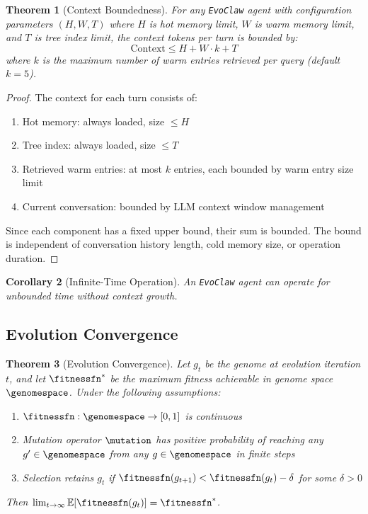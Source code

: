 \documentclass{article}
\newcommand{\evoclaw}{\texttt{EvoClaw}\xspace}
\newtheorem{theorem}{Theorem}[section]
\newtheorem{corollary}[theorem]{Corollary}
\begin{document}
\begin{theorem}[Context Boundedness]
For any \evoclaw{} agent with configuration parameters $(H, W, T)$ where $H$ is hot memory limit, $W$ is warm memory limit, and $T$ is tree index limit, the context tokens per turn is bounded by:
\begin{equation}
\text{Context} \leq H + W \cdot k + T
\end{equation}
where $k$ is the maximum number of warm entries retrieved per query (default $k=5$).
\end{theorem}

\begin{proof}
The context for each turn consists of:
\begin{enumerate}
    \item Hot memory: always loaded, size $\leq H$
    \item Tree index: always loaded, size $\leq T$
    \item Retrieved warm entries: at most $k$ entries, each bounded by warm entry size limit
    \item Current conversation: bounded by LLM context window management
\end{enumerate}
Since each component has a fixed upper bound, their sum is bounded. The bound is independent of conversation history length, cold memory size, or operation duration.
\end{proof}

\begin{corollary}[Infinite-Time Operation]
An \evoclaw{} agent can operate for unbounded time without context growth.
\end{corollary}

\subsection{Evolution Convergence}

\begin{theorem}[Evolution Convergence]
Let $g_t$ be the genome at evolution iteration $t$, and let $\fitnessfn^*$ be the maximum fitness achievable in genome space $\genomespace$. Under the following assumptions:
\begin{enumerate}
    \item $\fitnessfn: \genomespace \to [0, 1]$ is continuous
    \item Mutation operator $\mutation$ has positive probability of reaching any $g' \in \genomespace$ from any $g \in \genomespace$ in finite steps
    \item Selection retains $g_t$ if $\fitnessfn(g_{t+1}) < \fitnessfn(g_t) - \delta$ for some $\delta > 0$
\end{enumerate}
Then $\lim_{t \to \infty} \mathbb{E}[\fitnessfn(g_t)] = \fitnessfn^*$.
\end{theorem}
\end{document}
